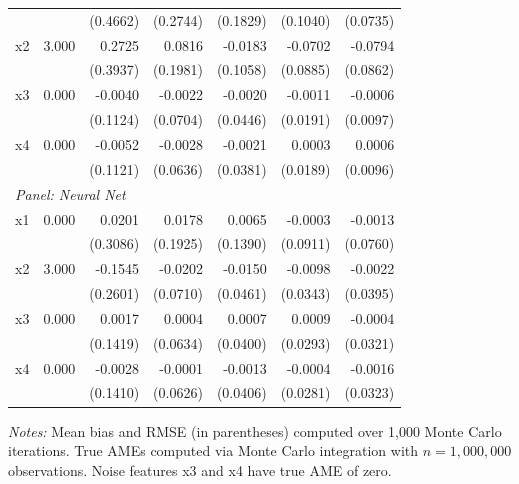 \begin{table}[htbp]
\begin{threeparttable}
\begin{tabular}{lrrrrrr}
 &  & (0.4662) & (0.2744) & (0.1829) & (0.1040) & (0.0735) \\
\quad x2 & 3.000 & 0.2725 & 0.0816 & -0.0183 & -0.0702 & -0.0794 \\
 &  & (0.3937) & (0.1981) & (0.1058) & (0.0885) & (0.0862) \\
\quad x3 & 0.000 & -0.0040 & -0.0022 & -0.0020 & -0.0011 & -0.0006 \\
 &  & (0.1124) & (0.0704) & (0.0446) & (0.0191) & (0.0097) \\
\quad x4 & 0.000 & -0.0052 & -0.0028 & -0.0021 & 0.0003 & 0.0006 \\
 &  & (0.1121) & (0.0636) & (0.0381) & (0.0189) & (0.0096) \\
\midrule
\multicolumn{7}{l}{\textit{Panel: Neural Net}} \\
\quad x1 & 0.000 & 0.0201 & 0.0178 & 0.0065 & -0.0003 & -0.0013 \\
 &  & (0.3086) & (0.1925) & (0.1390) & (0.0911) & (0.0760) \\
\quad x2 & 3.000 & -0.1545 & -0.0202 & -0.0150 & -0.0098 & -0.0022 \\
 &  & (0.2601) & (0.0710) & (0.0461) & (0.0343) & (0.0395) \\
\quad x3 & 0.000 & 0.0017 & 0.0004 & 0.0007 & 0.0009 & -0.0004 \\
 &  & (0.1419) & (0.0634) & (0.0400) & (0.0293) & (0.0321) \\
\quad x4 & 0.000 & -0.0028 & -0.0001 & -0.0013 & -0.0004 & -0.0016 \\
 &  & (0.1410) & (0.0626) & (0.0406) & (0.0281) & (0.0323) \\
\bottomrule
\end{tabular}
\begin{tablenotes}
\footnotesize
\item \textit{Notes:} Mean bias and RMSE (in parentheses) computed over 1,000 Monte Carlo iterations. True AMEs computed via Monte Carlo integration with $n=1{,}000{,}000$ observations. Noise features x3 and x4 have true AME of zero.
\end{tablenotes}
\end{threeparttable}
\end{table}